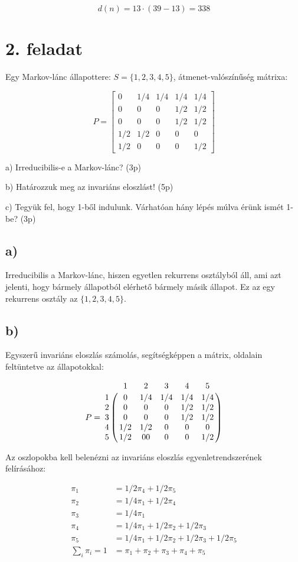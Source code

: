 \documentclass[a4paper,12pt]{article}
\begin{document}
\[
d(n) = 13 \cdot (39-13) = 338 
\]

\section*{2. feladat}
Egy Markov-lánc állapottere: $S = \{1, 2, 3, 4, 5\}$, átmenet-valószínűség mátrixa:

\[
P = 
\begin{bmatrix} 
0    &    1/4    &    1/4    &    1/4    &    1/4 \\
0    &    0      &    0      &    1/2    &    1/2 \\
0    &    0      &    0      &    1/2    &    1/2 \\
1/2    &    1/2      &    0      &    0    &    0 \\
1/2    &    0      &    0      &    0    &    1/2
\end{bmatrix}
\]

a)	Irreducibilis-e a Markov-lánc? (3p)

b)	Határozzuk meg az invariáns eloszlást! (5p)

c)	Tegyük fel, hogy 1-ből indulunk. Várhatóan hány lépés múlva érünk ismét 1-be? (3p)

\subsection*{a)}
Irreducibilis a Markov-lánc, hiszen egyetlen rekurrens osztályból áll, ami azt
jelenti, hogy bármely állapotból elérhető bármely másik állapot. Ez az egy 
rekurrens osztály az $\{1, 2, 3, 4, 5\}$.

\subsection*{b)}
Egyszerű invariáns eloszlás számolás, segítségképpen a mátrix, oldalain 
feltüntetve az állapotokkal:

\[
P = 
\bordermatrix{
~	&	1	&	2     &    3    &    4    &    5 	\cr
1	&	0	&	1/4   &    1/4  &    1/4  &    1/4  \cr
2	&	0	&	0     &    0    &    1/2  &    1/2  \cr
3	&	0	&	0     &    0    &    1/2  &    1/2  \cr
4	&	1/2	&	1/2   &    0    &    0    &    0    \cr
5	&	1/2	&	00    &    0    &    0    &    1/2}
\]

Az oszlopokba kell belenézni az invariáns eloszlás egyenletrendszerének
felírásához:

\begin{align*}
\pi_1 &= 1/2 \pi_4 + 1/2 \pi_5 \\
\pi_2 &= 1/4 \pi_1 + 1/2 \pi_4 \\
\pi_3 &= 1/4 \pi_1             \\
\pi_4 &= 1/4 \pi_1 + 1/2 \pi_2 + 1/2 \pi_3 \\
\pi_5 &= 1/4 \pi_1 + 1/2 \pi_2 + 1/2 \pi_3 + 1/2 \pi_5 \\
\sum_i \pi_i = 1 &= \pi_1 + \pi_2 + \pi_3 + \pi_4 + \pi_5
\end{align*}
\end{document}
